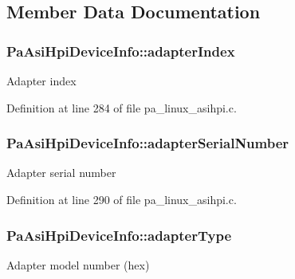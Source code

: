 \subsection{Member Data Documentation}
\subsubsection[{\texorpdfstring{adapter\+Index}{adapterIndex}}]{ Pa\+Asi\+Hpi\+Device\+Info\+::adapter\+Index}\hypertarget{struct_pa_asi_hpi_device_info_a262bff2b6846dd61e2cc0f8e6c696321}{}\label{struct_pa_asi_hpi_device_info_a262bff2b6846dd61e2cc0f8e6c696321}
Adapter index 

Definition at line 284 of file pa\+\_\+linux\+\_\+asihpi.\+c.

\subsubsection[{\texorpdfstring{adapter\+Serial\+Number}{adapterSerialNumber}}]{ Pa\+Asi\+Hpi\+Device\+Info\+::adapter\+Serial\+Number}\hypertarget{struct_pa_asi_hpi_device_info_a6b08780c17503edb4f0724e2f803d7e8}{}\label{struct_pa_asi_hpi_device_info_a6b08780c17503edb4f0724e2f803d7e8}
Adapter serial number 

Definition at line 290 of file pa\+\_\+linux\+\_\+asihpi.\+c.

\subsubsection[{\texorpdfstring{adapter\+Type}{adapterType}}]{ Pa\+Asi\+Hpi\+Device\+Info\+::adapter\+Type}\hypertarget{struct_pa_asi_hpi_device_info_af8c1c37195d84fc0e095e0f3bb3f26dc}{}\label{struct_pa_asi_hpi_device_info_af8c1c37195d84fc0e095e0f3bb3f26dc}
Adapter model number (hex) 

